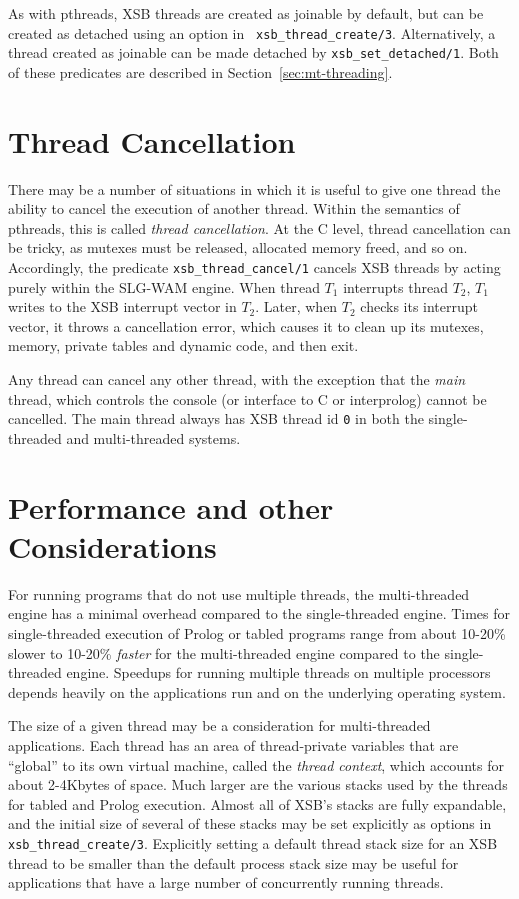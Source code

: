 As with pthreads, XSB threads are created as joinable by default, but
can be created as detached using an option in {\tt
  xsb\_thread\_create/3}.  Alternatively, a thread created as joinable
can be made detached by {\tt xsb\_set\_detached/1}.  Both of these
predicates are described in Section~\ref{sec:mt-threading}.

\section{Thread Cancellation}
%
There may be a number of situations in which it is useful to give one
thread the ability to cancel the execution of another thread.  Within
the semantics of pthreads, this is called {\em thread cancellation}.
At the C level, thread cancellation can be tricky, as mutexes must be
released, allocated memory freed, and so on.  Accordingly, the
predicate {\tt xsb\_thread\_cancel/1} cancels XSB threads by acting
purely within the SLG-WAM engine.  When thread $T_1$ interrupts thread
$T_2$, $T_1$ writes to the XSB interrupt vector in $T_2$.  Later, when
$T_2$ checks its interrupt vector, it throws a cancellation error,
which causes it to clean up its mutexes, memory, private tables and
dynamic code, and then exit.

Any thread can cancel any other thread, with the exception that the
{\em main} thread, which controls the console (or interface to C or
interprolog) cannot be cancelled.  The main thread always has XSB
thread id {\tt 0} in both the single-threaded and multi-threaded
systems.

\section{Performance and other Considerations}
%
For running programs that do not use multiple threads, the
multi-threaded engine has a minimal overhead compared to the
single-threaded engine.  Times for single-threaded execution of Prolog
or tabled programs range from about 10-20\% slower to 10-20\% {\em
  faster} for the multi-threaded engine compared to the
single-threaded engine.  Speedups for running multiple threads on
multiple processors depends heavily on the applications run and on the
underlying operating system.

The size of a given thread may be a consideration for multi-threaded
applications.  Each thread has an area of thread-private variables
that are ``global'' to its own virtual machine, called the {\em thread
  context}, which accounts for about 2-4Kbytes of space.  Much larger
are the various stacks used by the threads for tabled and Prolog
execution.  Almost all of XSB's stacks are fully expandable, and the
initial size of several of these stacks may be set explicitly as
options in {\tt xsb\_thread\_create/3}.  Explicitly setting a default
thread stack size for an XSB thread to be smaller than the default
process stack size may be useful for applications that have a large
number of concurrently running threads.  


